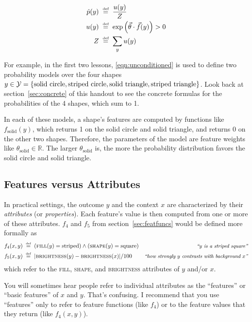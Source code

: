 \documentclass[11pt]{article}
\newcommand{\defeq}{\;\stackrel{\mbox{\tiny def}}{=}\;}
\newcommand{\vtheta}{\vec{\theta}}
\newcommand{\ph}{\hat{p}}
\newcommand{\Real}{{\mathbb R}}
\begin{document}
\vspace{-16pt}
\begin{align}
  \ph(y) &\defeq \frac{u(y)}{Z} \label{eqn:unconditioned} \\
  u(y) &\defeq \exp \left(\vtheta \cdot \vec{f}(y)\right) > 0 \\
  Z &\defeq \sum_y u(y)
\end{align}
\vspace{-12pt}

For example, in the first two lessons, \eqref{eqn:unconditioned} is
used to define two probability models over the four shapes
$y \in {\cal Y} = \{\text{solid circle}, \text{striped circle},
\text{solid triangle}, \text{striped triangle}\}$.
Look back at section~\ref{sec:concrete} of this
handout to see the concrete formulas for the probabilities of the 4
shapes, which sum to 1.

\medskip
In each of these models, a shape's features are computed by
functions like $f_{\textrm{solid}}(y)$, which returns 1 on the solid
circle and solid triangle, and returns 0 on the other two shapes.
Therefore, the parameters of the model are feature weights like
$\theta_{\textrm{solid}} \in \Real$.  The larger $\theta_{\textrm{solid}}$ is,
the more the probability distribution favors the solid circle and
solid triangle.

\subsection{Features versus Attributes}

In practical settings, the outcome $y$ and the context $x$ are
characterized by their {\em attributes} (or {\em properties}).  Each
feature's value is then computed from one or more of these attributes.
$f_4$ and $f_5$ from section~\ref{sec:featfuncs} would be defined more
formally as
\begin{align}
f_4(x,y) & \defeq (\textsc{fill}(y)=\text{striped}) \wedge (\textsc{shape}(y)=\text{square})
             & \text{\small\it ``$y$ is a striped square''} \\
f_5(x,y) & \defeq |\textsc{brightness}(y)-\textsc{brightness}(x)|/100
             & \text{\small\it ``how strongly $y$ contrasts with background $x$''}
\end{align}
which refer to the \textsc{fill}, \textsc{shape}, and \textsc{brightness} attributes
of $y$ and/or $x$.

\medskip
You will sometimes hear people refer to individual attributes as the
``features'' or ``basic features'' of $x$ and $y$.  That's confusing.
I recommend that you use ``features'' only to refer to feature
functions (like $f_4$) or to the feature values that they return (like $f_4(x,y)$).
\end{document}
